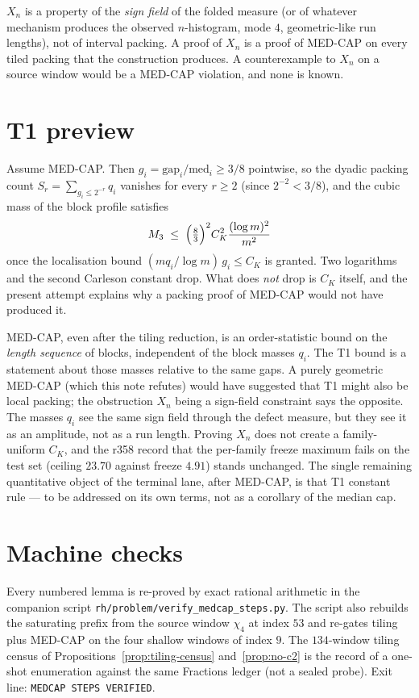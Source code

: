 \documentclass[11pt]{article}
\theoremstyle{remark}
\begin{document}
\medskip
$X_n$ is a property of the \emph{sign field} of the folded measure
(or of whatever mechanism produces the observed $n$-histogram,
mode $4$, geometric-like run lengths), not of interval packing.
A proof of $X_n$ is a proof of MED-CAP on every tiled packing that
the construction produces.  A counterexample to $X_n$ on a source
window would be a MED-CAP violation, and none is known.

\section{T1 preview}\label{sec:t1}

Assume MED-CAP.  Then $g_i=\mathrm{gap}_i/\mathrm{med}_i\ge 3/8$
pointwise, so the dyadic packing count $S_r=\sum_{g_i\le 2^{-r}}q_i$
vanishes for every $r\ge 2$ (since $2^{-2}<3/8$), and the cubic
mass of the block profile satisfies
\[
M_3
 \;\le\;
\Bigl(\tfrac83\Bigr)^2 C_K^2 \frac{(\log m)^2}{m^2}
\]
once the localisation bound $(m q_i/\log m)\,g_i\le C_K$ is granted.
Two logarithms and the second Carleson constant drop.  What does
\emph{not} drop is $C_K$ itself, and the present attempt explains
why a packing proof of MED-CAP would not have produced it.

MED-CAP, even after the tiling reduction, is an order-statistic
bound on the \emph{length sequence} of blocks, independent of the
block masses $q_i$.  The T1 bound is a statement about those
masses relative to the same gaps.  A purely geometric MED-CAP
(which this note refutes) would have suggested that T1 might also
be local packing; the obstruction $X_n$ being a sign-field
constraint says the opposite.  The masses $q_i$ see the same sign
field through the defect measure, but they see it as an amplitude,
not as a run length.  Proving $X_n$ does not create a
family-uniform $C_K$, and the r358 record that the per-family
freeze maximum fails on the test set (ceiling $23.70$ against
freeze $4.91$) stands unchanged.  The single remaining
quantitative object of the terminal lane, after MED-CAP, is that
T1 constant rule --- to be addressed on its own terms, not as a
corollary of the median cap.

\section{Machine checks}\label{sec:machine}

Every numbered lemma is re-proved by exact rational arithmetic in
the companion script \texttt{rh/problem/verify\_medcap\_steps.py}.
The script also rebuilds the saturating prefix from the source
window $\chi_4$ at index $53$ and re-gates tiling plus MED-CAP on
the four shallow windows of index $9$.  The $134$-window tiling
census of Propositions~\ref{prop:tiling-census}
and~\ref{prop:no-c2} is the record of a one-shot enumeration
against the same Fractions ledger (not a sealed probe).  Exit
line: \texttt{MEDCAP STEPS VERIFIED}.
\end{document}

